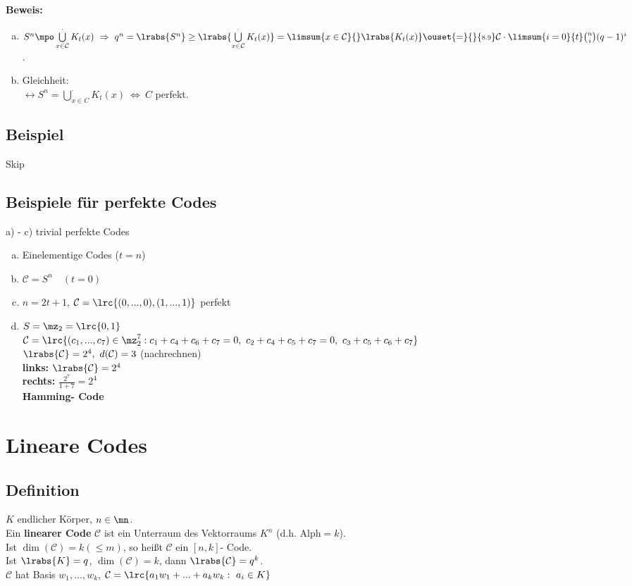 		\textbf{Beweis:}
		\begin{enumerate}[a)]
			\item $ S^n\mpo\bigcup\limits_{x\in\mathcal{C}}^{\cdot} K_t(x)\ \Rightarrow\ q^n=\lrabs{S^n}\geq\lrabs{\bigcup\limits_{x\in\mathcal{C}}^{\cdot}K_t(x)}=\limsum{x\in\mathcal{C}}{}\lrabs{K_t(x)}\ouset{=}{}{\mbox{\scriptsize 8.9}}\mathcal{C}\cdot\limsum{i=0}{t}\binom{n}{i}(q-1)^i $.
			\item  Gleichheit:\\
			$ \leftrightarrow S^n=\bigcup\limits_{x\in C}^{\cdot}K_t(x)\ \Leftrightarrow\ C $ perfekt.
		\end{enumerate}
	
	\subsection{Beispiel}
		Skip
		
	\subsection{Beispiele für perfekte Codes}
		a) - c) trivial perfekte Codes
		\begin{enumerate}[a)]
			\item Einelementige Codes ($ t=n $)
			\item $ \mathcal{C}=S^n\quad (t=0) $
			\item  $ n=2t+1 $, $ \mathcal{C}=\lrc{(0,...,0),(1,...,1)} $ perfekt
			\item $ S=\mz_2=\lrc{0,1} $\\
			$ \mathcal{C}=\lrc{(c_1,...,c_7)\in\mz_2^7:c_1+c_4+c_6+c_7=0,\ c_2+c_4+c_5+c_7=0,\ c_3+c_5+c_6+c_7} $\\
			$ \lrabs{\mathcal{C}}=2^4,\ d(\mathcal{C})=3 $ (nachrechnen)\\
			\textbf{links:} $ \lrabs{\mathcal{C}}=2^4 $\\
			\textbf{rechts:} $ \frac{2^7}{1+7}=2^4 $\\
			\textbf{Hamming- Code}
		\end{enumerate}
		
\section{Lineare Codes}
	\subsection{Definition}
		$ K $ endlicher Körper, $ n\in\mn $.\\
		Ein \textbf{linearer Code} $ \mathcal{C} $ ist ein Unterraum des Vektorraums $ K^n $ (d.h. Alph$ =k $).\\
		Ist $ \dim(\mathcal{C})=k(\leq m) $, so heißt $ \mathcal{C} $ ein $ [n,k] $- Code.\\
		Ist $ \lrabs{K}=q $, $ \dim(\mathcal{C})=k $, dann $ \lrabs{\mathcal{C}}=q^k $.\\
		$ \mathcal{C} $ hat Basis $ w_1,...,w_k $, $ \mathcal{C}=\lrc{a_1w_1+...+a_kw_k:\ a_i\in K} $
	
